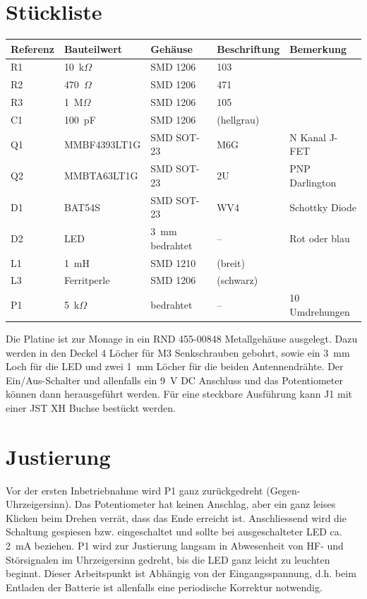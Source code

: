 \documentclass[a4paper,11pt,halfparskip,smallheadings,DIV=10]{scrartcl}
\begin{document}
\section{Stückliste}

\begin{center}\begin{tabular}{lllll}\toprule
    \textbf{Referenz} & \textbf{Bauteilwert} & \textbf{Gehäuse} & \textbf{Beschriftung} & \textbf{Bemerkung}\\\midrule
R1 & 10~k$\Omega$ & SMD 1206 & 103 & \\
R2 & 470~$\Omega$ & SMD 1206 & 471 & \\
R3 & 1~M$\Omega$  & SMD 1206 & 105 & \\
C1 & 100~pF       & SMD 1206 & (hellgrau) & \\
Q1 & MMBF4393LT1G & SMD SOT-23 & M6G & N Kanal J-FET\\ %
Q2 & MMBTA63LT1G  & SMD SOT-23 & 2U & PNP Darlington\\ 
D1 & BAT54S       & SMD SOT-23 & WV4 & Schottky Diode\\ %
D2 & LED          & 3~mm bedrahtet & -- & Rot oder blau\\
L1 & 1~mH         & SMD 1210   & (breit) & \\
L3 & Ferritperle  & SMD 1206   & (schwarz) & \\
P1 & 5~k$\Omega$  & bedrahtet  & -- & 10 Umdrehungen\\\bottomrule
\end{tabular}\end{center}

Die Platine ist zur Monage in ein RND 455-00848 Metallgehäuse ausgelegt. Dazu
werden in den Deckel 4 Löcher für M3 Senkschrauben gebohrt, sowie ein 3~mm
Loch für die LED und zwei 1~mm Löcher für die beiden Antennendrähte. Der
Ein/Aus-Schalter und allenfalls ein 9~V DC Anschluss und das Potentiometer
können dann herausgeführt werden. Für eine steckbare Ausführung kann J1
mit einer JST XH Buchse bestückt werden.

\section{Justierung}
Vor der ersten Inbetriebnahme wird P1 ganz zurückgedreht (Gegen-Uhrzeigersinn).
Das Potentiometer hat keinen Anschlag, aber ein ganz leises Klicken beim
Drehen verrät, dass das Ende erreicht ist. Anschliessend wird die Schaltung gespiesen
bzw. eingeschaltet und sollte bei ausgeschalteter LED ca. 2~mA beziehen. P1
wird zur Justierung langsam in Abwesenheit von HF- und Störsignalen im
Uhrzeigersinn gedreht, bis die LED ganz leicht zu leuchten beginnt. Dieser
Arbeitspunkt ist Abhängig von der Eingangsspannung, d.h. beim Entladen der
Batterie ist allenfalls eine periodische Korrektur notwendig.
\end{document}
